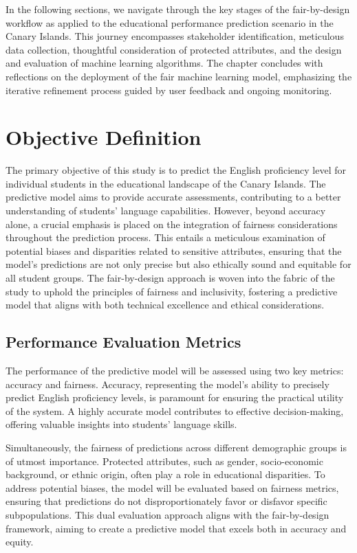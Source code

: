 \documentclass[12pt,a4paper,openright,twoside]{book}
\begin{document}
In the following sections, we navigate through the key stages of the fair-by-design workflow as applied to the educational performance prediction scenario in the Canary Islands. This journey encompasses stakeholder identification, meticulous data collection, thoughtful consideration of protected attributes, and the design and evaluation of machine learning algorithms. The chapter concludes with reflections on the deployment of the fair machine learning model, emphasizing the iterative refinement process guided by user feedback and ongoing monitoring.

\section{Objective Definition}

The primary objective of this study is to predict the English proficiency level for individual students in the educational landscape of the Canary Islands. The predictive model aims to provide accurate assessments, contributing to a better understanding of students' language capabilities. However, beyond accuracy alone, a crucial emphasis is placed on the integration of fairness considerations throughout the prediction process. This entails a meticulous examination of potential biases and disparities related to sensitive attributes, ensuring that the model's predictions are not only precise but also ethically sound and equitable for all student groups. The fair-by-design approach is woven into the fabric of the study to uphold the principles of fairness and inclusivity, fostering a predictive model that aligns with both technical excellence and ethical considerations.

\subsection{Performance Evaluation Metrics}

The performance of the predictive model will be assessed using two key metrics: accuracy and fairness. Accuracy, representing the model's ability to precisely predict English proficiency levels, is paramount for ensuring the practical utility of the system. A highly accurate model contributes to effective decision-making, offering valuable insights into students' language skills.

Simultaneously, the fairness of predictions across different demographic groups is of utmost importance. Protected attributes, such as gender, socio-economic background, or ethnic origin, often play a role in educational disparities. To address potential biases, the model will be evaluated based on fairness metrics, ensuring that predictions do not disproportionately favor or disfavor specific subpopulations. This dual evaluation approach aligns with the fair-by-design framework, aiming to create a predictive model that excels both in accuracy and equity.
\end{document}
